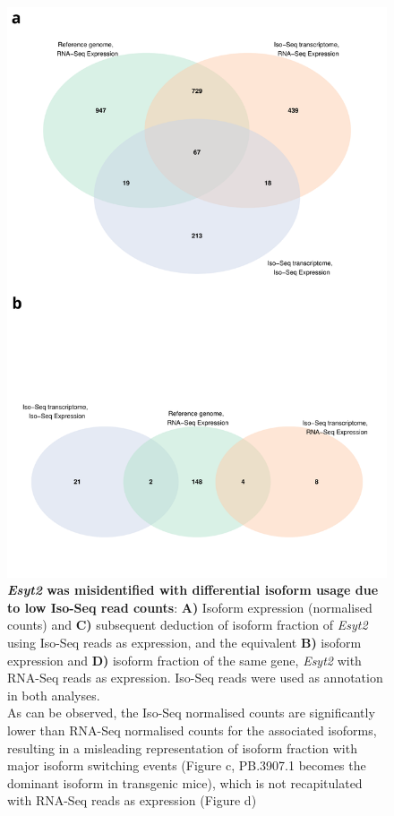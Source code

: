 \begin{figure}[htp]
	\begin{center}
		\includegraphics[page=9,scale = 0.55]{Figures/WholeDifferentialAnalysis.pdf}
	\end{center}
	\captionsetup{width=0.95\textwidth}
	\caption[\textit{Esyt2} was misidentified with differential isoform usage due to low Iso-Seq read counts]%
	{\textbf{\textit{Esyt2} was misidentified with differential isoform usage due to low Iso-Seq read counts}: \textbf{A)} Isoform expression (normalised counts) and \textbf{C)} subsequent deduction of isoform fraction of \textit{Esyt2} using Iso-Seq reads as expression, and the equivalent \textbf{B)} isoform expression and \textbf{D)} isoform fraction of the same gene, \textit{Esyt2} with RNA-Seq reads as expression. Iso-Seq reads were used as annotation in both analyses. 
		\\
		As can be observed, the Iso-Seq normalised counts are significantly lower than RNA-Seq normalised counts for the associated isoforms, resulting in a misleading representation of isoform fraction with major isoform switching events (Figure c, PB.3907.1 becomes the dominant isoform in transgenic mice), which is not recapitulated with RNA-Seq reads as expression (Figure d)}   
	\label{fig:DIU_esyt2}
\end{figure}

